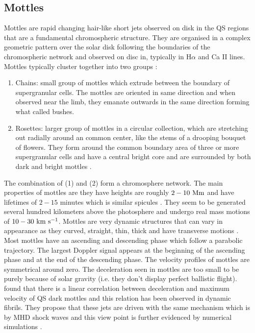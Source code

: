 \documentclass[12pt]{ociamthesis}
\newcommand{\kms}{~\rm{km ~s^{-1}}}
\newcommand{\np}{\\ \\}
\begin{document}
\subsection{Mottles}
\label{subsec:mots}
Mottles are rapid changing hair-like short jets observed on disk in the QS regions that are a fundamental chromospheric structure. They are organised in a complex geometric pattern over the solar disk following the boundaries of the chromospheric network and observed on disc in, typically in H$\alpha$ and Ca II lines. Mottles typically cluster together into two groups \citep{Beckers1963ApJ138648B}:
\begin{enumerate}
\item Chains: small group of mottles which extrude between the boundary of supergranular cells. The mottles are oriented in same direction and when observed near the limb, they emanate outwards in the same direction forming what \cite{Cragg1963ApJ138303C} called bushes. 
\item Rosettes: larger group of mottles in a circular collection, which are stretching out radially around an common center, like the stems of a drooping bouquet of flowers. They form around the common boundary area of three or more supergranular cells and have a central bright core and are surrounded by both dark and bright mottles \cite{Tsiropoula2012}.    
\end{enumerate}
The combination of (1) and (2) form a chromosphere network. The main properties of mottles are they have heights are roughly $2-10~\rm{Mm}$ and have lifetimes of $2-15$ minutes which is similar spicules \citep{Suematsu1995ApJ}. They seem to be generated several hundred kilometers above the photosphere and undergo real mass motions of $10-30\kms$. Mottles are very dynamic structures that can vary in appearance as they curved, straight, thin, thick and have transverse motions \citep{De_Pontieu2007ApJ}. Most mottles have an ascending and descending phase which follow a parabolic trajectory. The largest Doppler signal appears at the beginning of the ascending phase and at the end of the descending phase. The velocity profiles of mottles are symmetrical around zero. The deceleration seen in mottles are too small to be purely because of solar gravity (i.e. they don't display perfect ballistic flight). \cite{Rouppe2007ApJ660L169R} found that there is a linear correlation between deceleration and maximum velocity of QS dark mottles and this relation has been observed in dynamic fibrils. They propose that these jets are driven with the same mechanism which is by MHD shock waves and this view point is further evidenced by numerical simulations \citep{De_Pontieu2007ApJ, Hansteen2006ApJ}. \np
\end{document}
